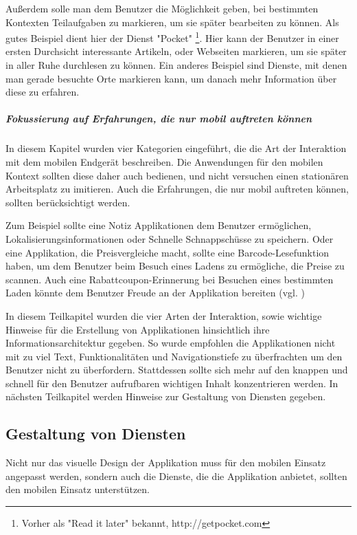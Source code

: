 Außerdem solle man dem Benutzer die Möglichkeit geben, bei bestimmten Kontexten Teilaufgaben zu markieren, um sie später bearbeiten zu können. Als gutes Beispiel dient hier der Dienst "Pocket" \footnote{Vorher als "Read it later" bekannt, http://getpocket.com }. Hier kann der Benutzer in einer ersten Durchsicht interessante Artikeln, oder Webseiten markieren, um sie später in aller Ruhe durchlesen zu können. Ein anderes Beispiel sind Dienste, mit denen man gerade besuchte Orte markieren kann, um danach mehr Information über diese zu erfahren.

\subparagraph{Fokussierung auf Erfahrungen, die nur mobil auftreten können} %
\label{subp:fokussiere_auf_erfahrungen_die_nur_mobil_auftreten_k_nnen}

In diesem Kapitel wurden vier Kategorien eingeführt, die die Art der Interaktion mit dem mobilen Endgerät beschreiben. Die Anwendungen für den mobilen Kontext sollten diese daher auch bedienen, und nicht versuchen einen stationären Arbeitsplatz zu imitieren. Auch die Erfahrungen, die nur mobil auftreten können, sollten berücksichtigt werden. 

Zum Beispiel sollte eine Notiz Applikationen dem Benutzer ermöglichen, Lokalisierungsinformationen oder Schnelle Schnappschüsse zu speichern. Oder eine Applikation, die Preisvergleiche macht, sollte eine Barcode-Lesefunktion haben, um dem Benutzer beim Besuch eines Ladens zu ermögliche, die Preise zu scannen.  Auch eine Rabattcoupon-Erinnerung bei Besuchen eines bestimmten Laden könnte dem Benutzer Freude an der Applikation bereiten (vgl. \cite{smartOnline})
\newline

In diesem Teilkapitel wurden die vier Arten der Interaktion, sowie wichtige Hinweise für die Erstellung von Applikationen hinsichtlich ihre Informationsarchitektur gegeben. So wurde empfohlen die Applikationen nicht mit zu viel Text, Funktionalitäten und Navigationstiefe zu überfrachten um den Benutzer nicht zu überfordern. Stattdessen sollte sich mehr auf den knappen und schnell für den Benutzer aufrufbaren wichtigen Inhalt konzentrieren werden. 
In nächsten Teilkapitel werden Hinweise zur Gestaltung von Diensten gegeben.

\subsection{Gestaltung von Diensten}
\label{sub:gestaltung_von_diensten}

Nicht nur das visuelle Design der Applikation muss für den mobilen Einsatz angepasst werden, sondern auch die Dienste, die die Applikation anbietet, sollten den mobilen Einsatz unterstützen. 

